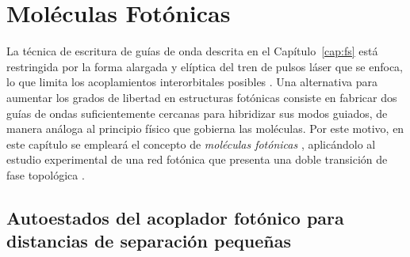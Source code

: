 \chapter{Moléculas Fotónicas \label{cap:molecules}}

La técnica de escritura de guías de onda descrita en el Capítulo~\ref{cap:fs} está restringida por la forma alargada y elíptica del tren de pulsos láser que se enfoca, lo que limita los acoplamientos interorbitales posibles \citep{interorbital}. Una alternativa para aumentar los grados de libertad en estructuras fotónicas consiste en fabricar dos guías de ondas suficientemente cercanas para hibridizar sus modos guiados, de manera análoga al principio físico que gobierna las moléculas. Por este motivo, en este capítulo se empleará el concepto de \textit{moléculas fotónicas} \citep{molecules}, aplicándolo al estudio experimental de una red fotónica que presenta una doble transición de fase topológica \citep{SPSSH}.

\section{Autoestados del acoplador fotónico para distancias de separación pequeñas}

